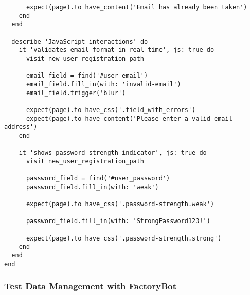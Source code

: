 \documentclass[12pt,a4paper]{article}
\begin{document}
\begin{lstlisting}
      expect(page).to have_content('Email has already been taken')
    end
  end

  describe 'JavaScript interactions' do
    it 'validates email format in real-time', js: true do
      visit new_user_registration_path

      email_field = find('#user_email')
      email_field.fill_in(with: 'invalid-email')
      email_field.trigger('blur')

      expect(page).to have_css('.field_with_errors')
      expect(page).to have_content('Please enter a valid email address')
    end

    it 'shows password strength indicator', js: true do
      visit new_user_registration_path

      password_field = find('#user_password')
      password_field.fill_in(with: 'weak')

      expect(page).to have_css('.password-strength.weak')

      password_field.fill_in(with: 'StrongPassword123!')

      expect(page).to have_css('.password-strength.strong')
    end
  end
end
\end{lstlisting}

\subsubsection{Test Data Management with FactoryBot}
\end{document}
